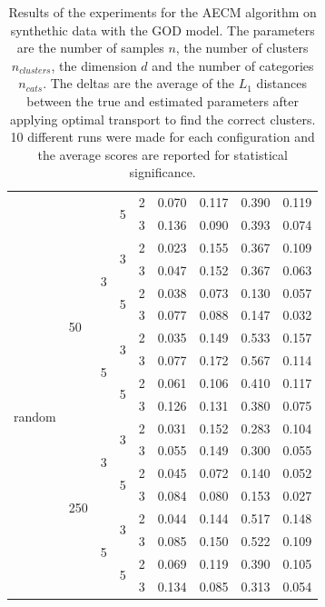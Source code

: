 \begin{table}[H]
\begin{minipage}{.48\columnwidth}
\begin{adjustbox}{width=\columnwidth}
\begin{tabular}{lllllrrrr}
\cline{4-9}
 &  &  & \multirow[t]{2}{*}{5} & 2 & 0.070 & 0.117 & 0.390 & 0.119 \\
 &  &  &  & 3 & 0.136 & 0.090 & 0.393 & 0.074 \\
\cline{1-9} \cline{2-9} \cline{3-9} \cline{4-9}
\multirow[t]{16}{*}{random} & \multirow[t]{8}{*}{50} & \multirow[t]{4}{*}{3} & \multirow[t]{2}{*}{3} & 2 & 0.023 & 0.155 & 0.367 & 0.109 \\
 &  &  &  & 3 & 0.047 & 0.152 & 0.367 & 0.063 \\
\cline{4-9}
 &  &  & \multirow[t]{2}{*}{5} & 2 & 0.038 & 0.073 & 0.130 & 0.057 \\
 &  &  &  & 3 & 0.077 & 0.088 & 0.147 & 0.032 \\
\cline{3-9} \cline{4-9}
 &  & \multirow[t]{4}{*}{5} & \multirow[t]{2}{*}{3} & 2 & 0.035 & 0.149 & 0.533 & 0.157 \\
 &  &  &  & 3 & 0.077 & 0.172 & 0.567 & 0.114 \\
\cline{4-9}
 &  &  & \multirow[t]{2}{*}{5} & 2 & 0.061 & 0.106 & 0.410 & 0.117 \\
 &  &  &  & 3 & 0.126 & 0.131 & 0.380 & 0.075 \\
\cline{2-9} \cline{3-9} \cline{4-9}
 & \multirow[t]{8}{*}{250} & \multirow[t]{4}{*}{3} & \multirow[t]{2}{*}{3} & 2 & 0.031 & 0.152 & 0.283 & 0.104 \\
 &  &  &  & 3 & 0.055 & 0.149 & 0.300 & 0.055 \\
\cline{4-9}
 &  &  & \multirow[t]{2}{*}{5} & 2 & 0.045 & 0.072 & 0.140 & 0.052 \\
 &  &  &  & 3 & 0.084 & 0.080 & 0.153 & 0.027 \\
\cline{3-9} \cline{4-9}
 &  & \multirow[t]{4}{*}{5} & \multirow[t]{2}{*}{3} & 2 & 0.044 & 0.144 & 0.517 & 0.148 \\
 &  &  &  & 3 & 0.085 & 0.150 & 0.522 & 0.109 \\
\cline{4-9}
 &  &  & \multirow[t]{2}{*}{5} & 2 & 0.069 & 0.119 & 0.390 & 0.105 \\
 &  &  &  & 3 & 0.134 & 0.085 & 0.313 & 0.054 \\
\cline{1-9} \cline{2-9} \cline{3-9} \cline{4-9}
\bottomrule
\end{tabular}
\end{adjustbox}
\caption{Results of the experiments for the AECM algorithm on synthethic data with the GOD model. The parameters are the number of samples $n$, the number of clusters $n_{clusters}$, the dimension $d$ and the number of categories $n_{cats}$. The deltas are the average of the $L_1$ distances between the true and estimated parameters after applying optimal transport to find the correct clusters. 10 different runs were made for each configuration and the average scores are reported for statistical significance.}

\end{minipage}
\end{table}
